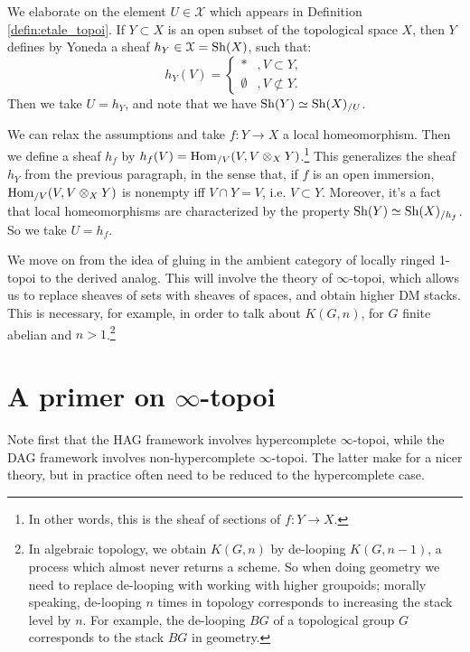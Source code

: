 \begin{rem}
We elaborate on the element $U \in \mathcal{X}$ which appears in Definition \ref{defin:etale_topoi}. If $Y \subset X$ is an
open subset of the topological space $X$, then $Y$ defines by Yoneda a sheaf $h_Y \in \mathcal{X} = \mathrm{Sh}(X)$, such that:
\[
h_Y(V) = \left\{ \begin{array} {ll} * & ,V \subset Y, \\ \emptyset &, V\not \subset Y. \end{array}\right.
\]
Then we take $U = h_Y$, and note that we have $\mathrm{Sh}(Y) \simeq \mathrm{Sh}(X)_{/U}$.

We can relax the assumptions and take $f:Y \to X$ a local homeomorphism. Then we define a sheaf $h_f$ by
$h_f(V) = \operatorname{Hom}_{/V}(V,V \otimes_X Y)$.\footnote{In other words, this is the sheaf of sections of $f:Y \to X$.}
 This generalizes the sheaf $h_Y$ from the previous paragraph, in the sense that,
if $f$ is an open immersion, $\operatorname{Hom}_{/V}(V,V \otimes_X Y)$ is nonempty iff $V\cap Y = V$, i.e. $V \subset Y$.
Moreover, it's a fact that local homeomorphisms are characterized by the property $\mathrm{Sh}(Y) \simeq \mathrm{Sh}(X)_{/h_f}$. So
we take $U = h_f$.
\end{rem}

We move on from the idea of gluing in the ambient category of locally ringed 1-topoi to the derived analog. This
will involve the theory of $\infty$-topoi, which allows us to replace sheaves of sets with sheaves of spaces,
and obtain higher DM stacks. This is necessary, for example, in order to talk about $K(G,n)$, for $G$ finite abelian
and $n>1$.\footnote{In algebraic topology, we obtain $K(G,n)$ by de-looping $K(G,n-1)$, a process which almost never
returns a scheme. So when doing geometry we need to replace de-looping with working with higher groupoids; morally
speaking, de-looping $n$ times in topology corresponds to increasing the stack level by $n$. For example, the de-looping
$BG$ of a topological group $G$ corresponds to the stack $BG$ in geometry.}


\section{A primer on $\infty$-topoi}
Note first that the HAG framework \cite{HAG-I} involves hypercomplete $\infty$-topoi, while the DAG framework
\cite{Lurie_DAG_V} involves non-hypercomplete 
$\infty$-topoi. The latter make for a nicer theory, but in practice often need to be reduced to the hypercomplete case.

